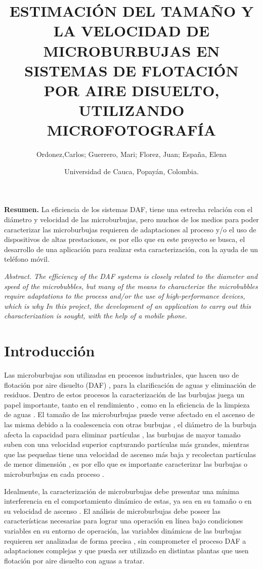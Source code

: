 \documentclass[12pt,twocolumn,a4paper]{article}
\title{ESTIMACIÓN DEL TAMAÑO Y LA VELOCIDAD DE
MICROBURBUJAS EN SISTEMAS DE FLOTACIÓN POR
AIRE DISUELTO, UTILIZANDO MICROFOTOGRAFÍA}
\author{Ordonez,Carlos;  Guerrero, Mari; Florez, Juan; España, Elena
 \\ 
\and{Universidad de Cauca, Popayán, Colombia.}\\
}
\begin{document}
\maketitle
\textbf{Resumen.}
La eficiencia de los sistemas DAF, tiene una estrecha relación con el diámetro y velocidad de las microburbujas, pero muchos de los medios para poder caracterizar las microburbujas requieren de adaptaciones al proceso y/o el uso de dispositivos de altas prestaciones, es por ello que en este proyecto se busca, el desarrollo de una aplicación para realizar esta caracterización, con la ayuda de un teléfono móvil. 

\textit{Abstract.}  
\textit{The efficiency of the DAF systems is closely related to the diameter and speed of the microbubbles, but many of the means to characterize the microbubbles require adaptations to the process and/or the use of high-performance devices, which is why In this project, the development of an application to carry out this characterization is sought, with the help of a mobile phone.}

\section{Introducción}

Las microburbujas son utilizadas en procesos industriales, que hacen uso de flotación por aire disuelto (DAF) \cite{cheng2016bubble}, para la clarificación de aguas y eliminación de residuos. Dentro de estos procesos la caracterización de las burbujas juega un papel importante, tanto en el rendimiento \cite{gulden2018online} \cite{eskanlou2018interactional} \cite{reis2016study}, como en la eficiencia de la limpieza de aguas \cite{sadeghi2020experimental} \cite{fanaie2020effect}. El tamaño de las microburbujas puede verse afectado en el ascenso de las misma debido a la coalescencia con otras burbujas \cite{fanaie2020effect}, el diámetro de la burbuja afecta la capacidad para eliminar partículas \cite{sadeghi2020experimental}, las burbujas de mayor tamaño suben con una velocidad superior capturando partículas más grandes, mientras que las pequeñas tiene una velocidad de ascenso más baja y recolectan partículas de menor dimensión \cite{sadeghi2020experimental} \cite{brasileiro2020construction}, es por ello que es importante caracterizar las burbujas o microburbujas en cada proceso \cite{sadeghi2020experimental} \cite{ahmadi2014nano}.


Idealmente, la caracterización de microburbujas debe presentar una mínima interferencia en el comportamiento dinámico de estas, ya sea en su tamaño o en su velocidad de ascenso \cite{gulden2018online}. El análisis de microburbujas debe poseer las características necesarias para lograr una operación en línea  bajo condiciones variables en su entorno de operación, las variables dinámicas de las burbujas requieren ser analizadas de forma precisa \cite{parmar2015terminal}, sin comprometer el proceso DAF a adaptaciones complejas y que pueda ser utilizado en distintas plantas que usen flotación por aire disuelto con aguas a tratar.
\end{document}
